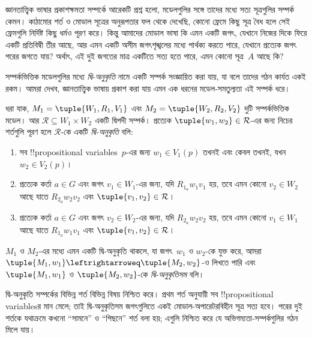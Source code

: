\documentclass[../../../include/open-logic-section]{subfiles}
\begin{document}


জ্ঞানতাত্ত্বিক ভাষার প্রকাশক্ষমতা সম্পর্কে আরেকটি প্রশ্ন হলো, মডেলগুলির সঙ্গে তাদের মধ্যে সত্য সূত্রগুলির সম্পর্ক কেমন। কাঠামোর শর্ত ও মোডাল সূত্রের অনুরূপতার ফল থেকে দেখেছি, কোনো ফ্রেমে কিছু সূত্র বৈধ হলে সেই ফ্রেমগুলি নির্দিষ্ট কিছু ধর্মও পূরণ করে। কিন্তু আমাদের মোডাল ভাষা কি এমন একটি জগৎ, যেখানে নিজের দিকে ফিরে একটি প্রতিবিম্বী তীর আছে, আর এমন একটি অসীম জগৎশৃঙ্খলের মধ্যে পার্থক্য করতে পারে, যেখানে প্রত্যেক জগৎ পরের জগতে যায়? অর্থাৎ, এই দুই জগতের মাত্র একটিতে সত্য হতে পারে, এমন কোনো সূত্র~$A$ আছে কি?

সম্পর্কভিত্তিক মডেলগুলির মধ্যে \emph{দ্বি-অনুকৃতি} নামে একটি সম্পর্ক সংজ্ঞায়িত করা যায়, যা বলে তাদের গঠন কার্যত একই রকম। আমরা দেখব, জ্ঞানতাত্ত্বিক ভাষায় প্রকাশ করা যায় এমন এক ধরনের মডেল-সমতুল্যতা এই সম্পর্ক ধরে।

\begin{defn}[দ্বি-অনুকৃতি]
ধরা যাক, $M_1 = \tuple{W_1, R_1, V_1}$ এবং $M_2 = \tuple{W_2, R_2, V_2}$ দুটি সম্পর্কভিত্তিক মডেল। আর $\mathcal{R} \subseteq W_1 \times W_2$ একটি দ্বিপদী সম্পর্ক। প্রত্যেক $\tuple{w_1, w_2} \in \mathcal{R}$-এর জন্য নিচের শর্তগুলি পূরণ হলে $\mathcal{R}$-কে একটি \emph{দ্বি-অনুকৃতি} বলি:

\begin{enumerate}
  \item সব !!{propositional variable}s~$p$-এর জন্য $w_1 \in V_1(p)$ তখনই এবং কেবল তখনই, যখন $w_2 \in V_2(p)$।
  \item প্রত্যেক কর্তা $a \in G$ এবং জগৎ $v_1 \in W_1$-এর জন্য, যদি $R_{1_a} w_1 v_1$ হয়, তবে এমন কোনো $v_2 \in W_2$ আছে যাতে $R_{2_a} w_2 v_2$ এবং $\tuple{v_1, v_2} \in
  \mathcal{R}$।
  \item প্রত্যেক কর্তা $a \in G$ এবং জগৎ $v_2 \in W_2$-এর জন্য, যদি
   $R_{2_a} w_2 v_2$ হয়, তবে এমন কোনো $v_1 \in W_1$ আছে যাতে
   $R_{1_a} w_1 v_1$ এবং $\tuple{v_1, v_2} \in
   \mathcal{R}$।
\end{enumerate}

$M_1$ ও $M_2$-এর মধ্যে এমন একটি দ্বি-অনুকৃতি থাকলে, যা জগৎ~$w_1$ ও $w_2$-কে যুক্ত করে, আমরা $\tuple{M_1, w_1} \leftrightarroweq
\tuple{M_2, w_2}$-ও লিখতে পারি এবং $\tuple{M_1, w_1}$ ও $\tuple{M_2, w_2}$-কে \emph{দ্বি-অনুকৃতিসম} বলি।
\end{defn}

দ্বি-অনুকৃতি সম্পর্কের বিভিন্ন শর্ত বিভিন্ন বিষয় নিশ্চিত করে। প্রথম শর্ত অনুযায়ী সব !!{propositional variable}sর মান মেলে; তাই দ্বি-অনুকৃতিসম জগৎগুলিতে একই মোডাল-অপারেটরবিহীন সূত্র সত্য হবে। পরের দুই শর্তকে যথাক্রমে কখনো ``সামনে'' ও ``পিছনে'' শর্ত বলা হয়; এগুলি নিশ্চিত করে যে অভিগম্যতা-সম্পর্কগুলির গঠন মিলে যায়।
\end{document}
